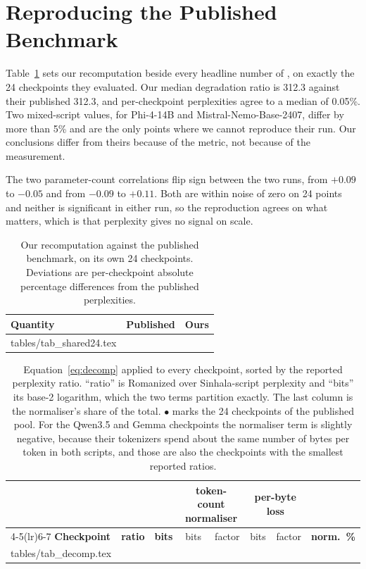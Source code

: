 \documentclass[11pt]{article}
\makeatletter
\newcommand{\rows}[1]{\@@input #1 }
\makeatother
\begin{document}
\section{Reproducing the Published Benchmark}
\label{sec:repro24}

Table~\ref{tab:shared24} sets our recomputation beside every headline number of
\citet{rajapakse-weerasinghe-2026-script}, on exactly the 24 checkpoints they
evaluated. Our median degradation ratio is 312.3 against their published 312.3,
and per-checkpoint perplexities agree to a median of 0.05\%. Two mixed-script
values, for Phi-4-14B and Mistral-Nemo-Base-2407, differ by more than 5\% and are
the only points where we cannot reproduce their run. Our conclusions differ from
theirs because of the metric, not because of the measurement.

The two parameter-count correlations flip sign between the two runs, from $+0.09$
to $-0.05$ and from $-0.09$ to $+0.11$. Both are within noise of zero on 24
points and neither is significant in either run, so the reproduction agrees on
what matters, which is that perplexity gives no signal on scale.

\begin{table}[t]
\centering\footnotesize
\setlength{\tabcolsep}{2.4pt}
\begin{tabular}{@{}lrr@{}}
\toprule
\textbf{Quantity} & \textbf{Published} & \textbf{Ours} \\
\midrule
\rows{tables/tab_shared24.tex}
\bottomrule
\end{tabular}
\caption{Our recomputation against the published benchmark, on its own 24
checkpoints. Deviations are per-checkpoint absolute percentage differences from
the published perplexities.}
\label{tab:shared24}
\end{table}

\begin{table}[t]
\centering\scriptsize
\setlength{\tabcolsep}{5pt}
\begin{tabular}{@{}lr r rr rr r@{}}
\toprule
& & & \multicolumn{2}{c}{\textbf{token-count normaliser}}
& \multicolumn{2}{c}{\textbf{per-byte loss}} & \\
\cmidrule(lr){4-5}\cmidrule(lr){6-7}
\textbf{Checkpoint} & \textbf{ratio} & \textbf{bits} & bits & factor & bits & factor
& \textbf{norm.\ \%} \\
\midrule
\rows{tables/tab_decomp.tex}
\bottomrule
\end{tabular}
\caption{Equation~\ref{eq:decomp} applied to every checkpoint, sorted by the
reported perplexity ratio. ``ratio'' is Romanized over Sinhala-script perplexity
and ``bits'' its base-2 logarithm, which the two terms partition exactly. The
last column is the normaliser's share of the total. $\bullet$ marks the 24
checkpoints of the published pool. For the Qwen3.5 and Gemma checkpoints the
normaliser term is slightly negative, because their tokenizers spend about the
same number of bytes per token in both scripts, and those are also the
checkpoints with the smallest reported ratios.}
\label{tab:decomp}
\end{table}
\end{document}
